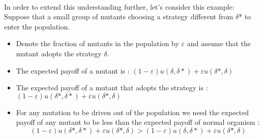 \paragraph{}
\paragraph{}In order to extend this understanding further, let's consider this example:
Suppose that a small group of mutants choosing a strategy different from $\delta$* to enter the population.
\begin{itemize}
\item Denote the fraction of mutants in the population by $\varepsilon$ and assume that the mutant adopts the strategy $\delta$.
\item The expected payoff of a mutant is : 
	$(1-\varepsilon)u(\delta,\delta*)+\varepsilon u(\delta*,\delta)$
\item The expected payoff of a mutant that adopts the strategy is :	\\
	$(1-\varepsilon)u(\delta*,\delta*)+\varepsilon u(\delta*,\delta)$
	\item For any mutation to be driven out of the population we need the expected payoff of any mutant to be less than the expected payoff of normal organism :\\
	\begin{equation}(1-\varepsilon)u(\delta*,\delta*)+\varepsilon u(\delta*,\delta) > (1-\varepsilon)u(\delta,\delta*)+\varepsilon u(\delta*,\delta)  \end{equation}
\end{itemize}



